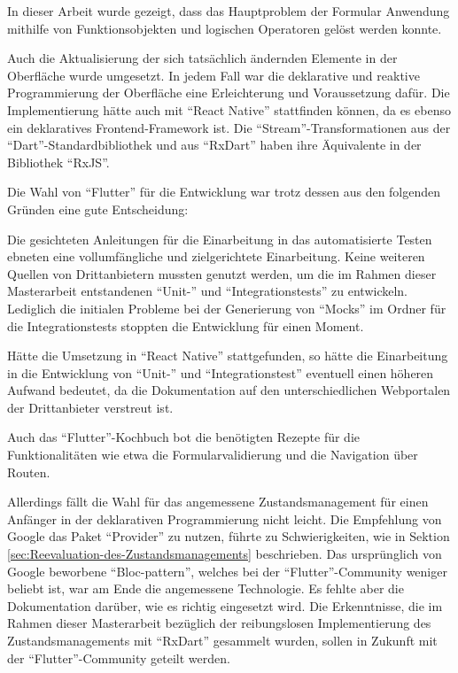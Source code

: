 

In dieser Arbeit wurde gezeigt, dass  das Hauptproblem der Formular Anwendung mithilfe von Funktionsobjekten und logischen Operatoren gelöst werden konnte.

Auch die  Aktualisierung der sich tatsächlich ändernden Elemente in der Oberfläche wurde umgesetzt.
In jedem Fall war die deklarative und reaktive Programmierung der Oberfläche eine Erleichterung und Voraussetzung dafür.
Die Implementierung hätte auch mit \enquote{React Native} stattfinden können,
da es ebenso ein deklaratives Frontend-Framework ist.
Die \enquote{Stream}-Transformationen aus der \enquote{Dart}-Standardbibliothek und aus \enquote{RxDart} haben ihre Äquivalente in der Bibliothek \enquote{RxJS}.

Die Wahl von \enquote{Flutter} für die Entwicklung war trotz dessen aus den folgenden Gründen eine gute Entscheidung:

Die gesichteten Anleitungen für die Einarbeitung in das automatisierte Testen ebneten eine vollumfängliche und zielgerichtete Einarbeitung.
Keine weiteren Quellen von Drittanbietern mussten genutzt werden,
um die im Rahmen dieser Masterarbeit entstandenen \enquote{Unit-} und \enquote{Integrationstests} zu entwickeln.
Lediglich die initialen Probleme bei der Generierung von \enquote{Mocks} im Ordner für die Integrationstests stoppten die Entwicklung für einen Moment.

Hätte die Umsetzung in \enquote{React Native} stattgefunden,
so hätte die Einarbeitung in die Entwicklung von \enquote{Unit-} und \enquote{Integrationstest} eventuell einen höheren Aufwand bedeutet,
da die Dokumentation auf den unterschiedlichen Webportalen der Drittanbieter verstreut ist.

Auch das \enquote{Flutter}-Kochbuch bot die benötigten Rezepte für die Funktionalitäten wie etwa die Formularvalidierung und
die Navigation über Routen.

Allerdings fällt die Wahl für das angemessene Zustandsmanagement für einen Anfänger in der deklarativen Programmierung nicht leicht.
Die Empfehlung von Google das Paket \enquote{Provider} zu nutzen, führte zu Schwierigkeiten,
wie in Sektion \ref{sec:Reevaluation-des-Zustandsmanagements}
beschrieben.
Das ursprünglich von Google beworbene \enquote{Bloc-pattern},
welches bei der \enquote{Flutter}-Community weniger beliebt ist,
war am Ende die angemessene Technologie.
Es fehlte aber die Dokumentation darüber,
wie es richtig eingesetzt wird.
Die Erkenntnisse,
die im Rahmen dieser Masterarbeit bezüglich der reibungslosen Implementierung des Zustandsmanagements mit \enquote{RxDart} gesammelt wurden,
sollen in Zukunft mit der \enquote{Flutter}-Community geteilt werden.


